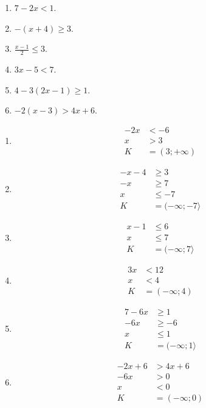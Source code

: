 \documentclass[11pt,a4paper]{article}
\begin{document}
\begin{zadaniReseniBox}[title={Domácí úkol}]
\begin{enumerate}[label=\alph*)]
\item
$7-2x<1$.
\item
$-(x+4)\ge3$.
\item
$\frac{x-1}{2}\le3$.
\item
$3x-5<7$.
\item
$4-3(2x-1)\ge1$.
\item
$-2(x-3)>4x+6$.
\end{enumerate}
\tcblower
\begin{enumerate}[label=\alph*)]
\item
\[
\begin{aligned}
-2x&<-6 \\
 x&>3 \\[2mm]
K &= (3;+\infty)
\end{aligned}
\]
\item
\[
\begin{aligned}
-x-4&\ge3 \\
 -x&\ge7 \\
 x&\le-7 \\[2mm]
K &= (-\infty;-7\rangle
\end{aligned}
\]
\item
\[
\begin{aligned}
x-1&\le6 \\
 x&\le7 \\[2mm]
K &= (-\infty;7\rangle
\end{aligned}
\]
\item
\[
\begin{aligned}
3x&<12\\x&<4 \\[2mm]
K &= (-\infty;4)
\end{aligned}
\]
\item
\[
\begin{aligned}
7-6x&\ge1\\-6x&\ge-6\\x&\le1 \\[2mm]
K &= (-\infty;1\rangle
\end{aligned}
\]
\item
\[
\begin{aligned}
-2x+6&>4x+6\\-6x&>0\\x&<0 \\[2mm]
K &= (-\infty;0)
\end{aligned}
\]
\end{enumerate}
\end{zadaniReseniBox}
\end{document}
